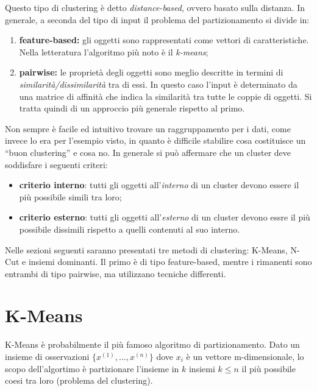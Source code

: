 \newpage

Questo tipo di clustering è detto \emph{distance-based}, ovvero basato sulla distanza. In generale, a seconda del tipo di input il problema del partizionamento si divide in:
\begin{enumerate}
	\item \textbf{feature-based:} gli oggetti sono rappresentati come vettori di caratteristiche. Nella letteratura l'algoritmo più noto è il \emph{k-means};
	\item \textbf{pairwise:} le proprietà degli oggetti sono meglio descritte in termini di \emph{similarità/dissimilarità} tra di essi. In questo caso l'input è determinato da una matrice di affinità che indica la similarità tra tutte le coppie di oggetti. Si tratta quindi di un approccio più generale rispetto al primo.
\end{enumerate}

Non sempre è facile ed intuitivo trovare un raggruppamento per i dati, come invece lo era per l’esempio visto, in quanto è difficile stabilire cosa costituisce un “buon clustering” e cosa no. In generale si può affermare che un cluster deve soddisfare i seguenti criteri:
\begin{itemize}
	\item \textbf{criterio interno}: tutti gli oggetti all'\emph{interno} di un cluster devono essere il più possibile simili tra loro;
	\item \textbf{criterio esterno}: tutti gli oggetti all'\emph{esterno} di un cluster devono essre il più possibile dissimili rispetto a quelli contenuti al suo interno.
\end{itemize}

Nelle sezioni seguenti saranno presentati tre metodi di clustering:  K-Means, N-Cut e insiemi dominanti. Il primo è di tipo feature-based, mentre i rimanenti sono entrambi di tipo pairwise, ma utilizzano tecniche differenti.

\newpage

\section{K-Means} %
\label{sec:k_means}
K-Means è probabilmente il più famoso algoritmo di partizionamento. Dato un insieme di osservazioni $\{x^{(1)},\dots,x^{(n)} \}$ dove $x_i$ è un vettore m-dimensionale, lo scopo dell'algortimo è partizionare l'insieme in $k$ insiemi $k \leq n$ il più possibile coesi tra loro (problema del clustering).\\

